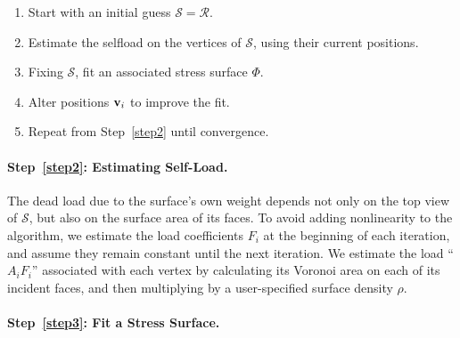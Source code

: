 \documentclass[review]{acmsiggraph}
\def\SS{{\mathcal S}}
\def\RR{{\mathcal R}}
\begin{document}
\begin{enumerate}\itemsep-\parsep\setcounter{enumi}{-1}

\item Start with an initial guess $\SS = \RR$.

\item \label{step2} Estimate the self\dash load on the vertices of $\SS$, 
using their current positions.

\item \label{step3} Fixing $\SS$, fit an associated stress surface $\Phi$.

\item \label{step4} Alter positions ${\mathbf v}_i$ to improve the fit.

\item Repeat from Step~\ref{step2} until convergence.

\end{enumerate}

\paragraph{Step~\ref{step2}: Estimating Self-Load.}

The dead load due to the surface's own weight depends not only on the top 
view of $\SS$, but also on the surface area of its faces. To avoid adding 
nonlinearity to the algorithm, we estimate the load coefficients $F_i$ at 
the beginning of each iteration, and assume they remain constant until the 
next iteration. We estimate the load ``$A_iF_i$'' associated with each 
vertex by calculating its Voronoi area on each of its incident faces, and 
then multiplying by a user-specified surface density $\rho$.

\paragraph{Step~\ref{step3}: Fit a Stress Surface.}
\end{document}
